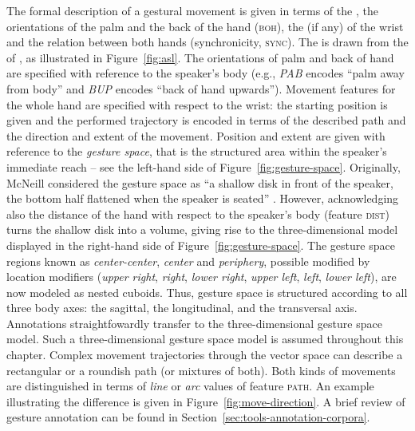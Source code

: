 \documentclass[output=paper]{langsci/langscibook}
\begin{document}
The formal description of a gestural movement is given in terms of the ,  the orientations of the palm  and the back of the hand (\textsc{boh}),  the  (if any) of the wrist  and the relation between both hands (synchronicity, \textsc{sync}). 
%
The  is drawn from the  of , as illustrated in Figure~\ref{fig:asl}.
%
The orientations  of palm and back of hand are specified with reference to the speaker's body (e.g., \textit{PAB} encodes \enquote{palm away from body} and \textit{BUP} encodes \enquote{back of hand upwards}). 
%
Movement features for the whole hand are specified with respect to the wrist: the starting position  is given and the performed trajectory is encoded in terms of the described path  and the direction  and extent  of the movement.
%
Position and extent are given with reference to the \emph{gesture space}, that is the structured area within the speaker's immediate reach \citep[--89]{McNeill:1992} -- see the left-hand side of Figure~\ref{fig:gesture-space}. 
%
Originally, McNeill considered the gesture space as \enquote{a shallow disk in front of the speaker, the bottom half flattened when the speaker is seated} \citep[]{McNeill:1992}. 
%
However, acknowledging also the distance of the hand with respect to the speaker's body (feature \textsc{dist}) turns the shallow disk into a volume, giving rise to the three-dimensional model displayed in the right-hand side of Figure~\ref{fig:gesture-space}.
%
The gesture space regions known as \emph{center-center}, \emph{center} and \emph{periphery}, possible modified by location modifiers (\emph{upper right}, \emph{right}, \emph{lower right}, \emph{upper left}, \emph{left}, \emph{lower left}), are now modeled as nested cuboids. 
%
Thus, gesture space is structured according to all three body axes: the sagittal, the longitudinal, and the transversal axis.
%
Annotations straightfowardly transfer to the three-dimensional gesture space model.
%
Such a three-dimensional gesture space model is assumed throughout this chapter.
%
Complex movement trajectories through the vector space can describe a rectangular or a roundish path (or mixtures of both). 
%
Both kinds of movements are distinguished in terms of \textit{line}  or \textit{arc}  values of feature \textsc{path}.
%
An example illustrating the difference is given in Figure~\ref{fig:move-direction}.
%
A brief review of gesture annotation can be found in Section~\ref{sec:tools-annotation-corpora}.
%
\end{document}
